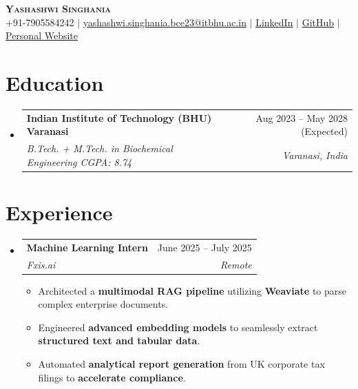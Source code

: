 \documentclass[letterpaper,10.5pt]{article}
\makeatletter
\newcommand{\resumeItem}[1]{
  \item\small{#1 \vspace{-2pt}}
}
\newcommand{\resumeSubheading}[4]{
  \vspace{-2pt}\item
    \begin{tabular*}{0.97\textwidth}[t]{l@{\extracolsep{\fill}}r}
      \textbf{#1} & #2 \\
      \textit{\small#3} & \textit{\small #4} \\
    \end{tabular*}\vspace{-7pt}
}
\newcommand{\resumeSubHeadingListStart}{\begin{itemize}[leftmargin=0.15in, label={}]}
\newcommand{\resumeSubHeadingListEnd}{\end{itemize}}
\newcommand{\resumeItemListStart}{\begin{itemize}}
\newcommand{\resumeItemListEnd}{\end{itemize}\vspace{-5pt}}
\makeatother
\begin{document}
\begin{center}
    \textbf{\Huge \scshape Yashashwi Singhania} \\ \vspace{1pt}
    \small +91-7905584242 $|$ \href{mailto:yashashwi.singhania.bce23@itbhu.ac.in}{\underline{yashashwi.singhania.bce23@itbhu.ac.in}} $|$
    \href{https://linkedin.com/in/yashashwi-singhania-b500bb2a9}{\underline{LinkedIn}} $|$
    \href{https://github.com/yashashwi-s}{\underline{GitHub}} $|$
    \href{https://yashashwi.me/}{\underline{Personal Website}}
\end{center}

\section{Education}
  \resumeSubHeadingListStart
    \resumeSubheading
  {Indian Institute of Technology (BHU) Varanasi}{Aug 2023 -- May 2028 (Expected)}
  {B.Tech. + M.Tech. in Biochemical Engineering \textbar{} CGPA: 8.74}{Varanasi, India}
  \resumeSubHeadingListEnd

\section{Experience}
  \resumeSubHeadingListStart
    \resumeSubheading
      {Machine Learning Intern}{June 2025 -- July 2025}
      {Fxis.ai}{Remote}
      \resumeItemListStart
  \resumeItem{Architected a \textbf{multimodal RAG pipeline} utilizing \textbf{Weaviate} to parse complex enterprise documents.}
  \resumeItem{Engineered \textbf{advanced embedding models} to seamlessly extract \textbf{structured text and tabular data}.}
  \resumeItem{Automated \textbf{analytical report generation} from UK corporate tax filings to \textbf{accelerate compliance}.}
\resumeItemListEnd
  \resumeSubHeadingListEnd

\end{document}
